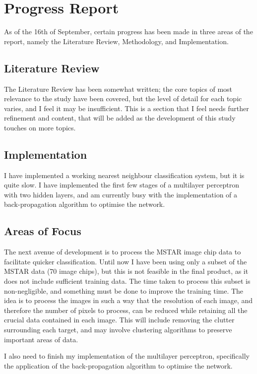 \appendix
\chapter{Progress Report}

As of the 16th of September, certain progress has been made in three areas of the report, namely the Literature Review, Methodology, and Implementation.


\section{Literature Review}
The Literature Review has been somewhat written; the core topics of most relevance to the study have been covered, but the level of detail for each topic varies, and I feel it may be insufficient. This is a section that I feel needs further refinement and content, that will be added as the development of this study touches on more topics.

\section{Implementation}
I have implemented a working nearest neighbour classification system, but it is quite slow. I have implemented the first few stages of a multilayer perceptron with two hidden layers, and am currently busy with the implementation of a back-propagation algorithm to optimise the network.


\section{Areas of Focus}
The next avenue of development is to process the MSTAR image chip data to facilitate quicker classification. Until now I have been using only a subset of the MSTAR data (70 image chips), but this is not feasible in the final product, as it does not include sufficient training data. The time taken to process this subset is non-negligible, and something must be done to improve the training time. The idea is to process the images in such a way that the resolution of each image, and therefore the number of pixels to process, can be reduced while retaining all the crucial data contained in each image. This will include removing the clutter surrounding each target, and may involve clustering algorithms to preserve important areas of data.

I also need to finish my implementation of the multilayer perceptron, specifically the application of the back-propagation algorithm to optimise the network.

